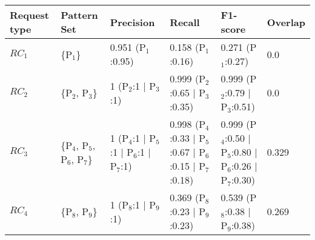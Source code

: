 \begin{tabular}{llllll}
\toprule
Request type &                     Pattern Set &                                                 Precision &                                                                    Recall &                                                                  F1-score & Overlap \\
\midrule
      $RC_1$ &                       \{P$_1$\} &                                        0.951 (P$_1$:0.95) &                                                        0.158 (P$_1$:0.16) &                                                        0.271 (P$_1$:0.27) &     0.0 \\
      $RC_2$ &                \{P$_2$, P$_3$\} &                                1 (P$_2$:1 $\mid$ P$_3$:1) &                                      0.999 (P$_2$:0.65 $\mid$ P$_3$:0.35) &                                      0.999 (P$_2$:0.79 $\mid$ P$_3$:0.51) &     0.0 \\
      $RC_3$ &  \{P$_4$, P$_5$, P$_6$, P$_7$\} &  1 (P$_4$:1 $\mid$ P$_5$:1 $\mid$ P$_6$:1 $\mid$ P$_7$:1) &  0.998 (P$_4$:0.33 $\mid$ P$_5$:0.67 $\mid$ P$_6$:0.15 $\mid$ P$_7$:0.18) &  0.999 (P$_4$:0.50 $\mid$ P$_5$:0.80 $\mid$ P$_6$:0.26 $\mid$ P$_7$:0.30) &   0.329 \\
      $RC_4$ &                \{P$_8$, P$_9$\} &                                1 (P$_8$:1 $\mid$ P$_9$:1) &                                      0.369 (P$_8$:0.23 $\mid$ P$_9$:0.23) &                                      0.539 (P$_8$:0.38 $\mid$ P$_9$:0.38) &   0.269 \\
\bottomrule
\end{tabular}
